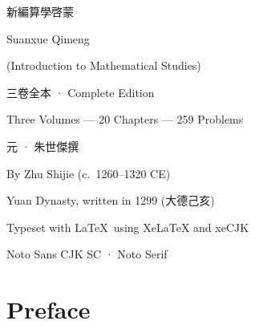 \documentclass[11pt,a4paper]{article}
\begin{document}
\begin{titlepage}
\begin{center}
\vspace*{3cm}

{\fontsize{28}{36}\selectfont\color{titlecolor}
  新編\!算學\!啓蒙}

\vspace{0.8cm}

{\fontsize{18}{24}\selectfont\color{sectioncolor}
  Suanxue Qimeng}

\vspace{0.3cm}

{\large\color{sectioncolor}
  (Introduction to Mathematical Studies)}

\vspace{2cm}

{\LARGE\color{titlecolor} 三卷全本 · Complete Edition}

\vspace{0.5cm}

{\large Three Volumes — 20 Chapters — 259 Problems}

\vspace{3cm}

{\large 元 · 朱世傑撰}

\vspace{0.3cm}

{\normalsize\color{sectioncolor}
  By Zhu Shijie (c.\ 1260--1320 CE)}

\vspace{0.2cm}

{\small\color{sectioncolor}
  Yuan Dynasty, written in 1299 (大德己亥)}

\vspace{4cm}

{\small\color{notecolor}
  Typeset with \LaTeX\ using XeLaTeX and xeCJK}

\vspace{0.3cm}

{\small\color{notecolor}
  Noto Sans CJK SC · Noto Serif}

\end{center}
\end{titlepage}

\tableofcontents
\newpage

\section*{Preface}
\end{document}
